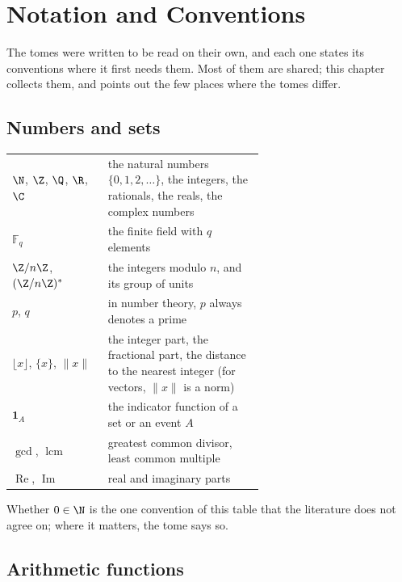\chapter{Notation and Conventions}\label{ch:notation}

The tomes were written to be read on their own, and each one states its conventions where it first needs them. Most of
them are shared; this chapter collects them, and points out the few places where the tomes differ.

\section{Numbers and sets}

\begin{center}\small
\begin{tabular}{@{}lp{0.62\linewidth}@{}}
$\N$, $\Z$, $\Q$, $\R$, $\C$ & the natural numbers $\{0,1,2,\dots\}$, the integers, the rationals, the reals, the complex numbers\\
$\mathbb F_q$ & the finite field with $q$ elements\\
$\Z/n\Z$, $(\Z/n\Z)^*$ & the integers modulo $n$, and its group of units\\
$p$, $q$ & in number theory, $p$ always denotes a prime\\
$\lfloor x\rfloor$, $\{x\}$, $\|x\|$ & the integer part, the fractional part, the distance to the nearest integer (for vectors, $\|x\|$ is a norm)\\
$\mathbf 1_A$ & the indicator function of a set or an event $A$\\
$\gcd$, $\operatorname{lcm}$ & greatest common divisor, least common multiple\\
$\operatorname{Re}$, $\operatorname{Im}$ & real and imaginary parts
\end{tabular}
\end{center}

Whether $0\in\N$ is the one convention of this table that the literature does not agree on; where it matters, the
tome says so.

\section{Arithmetic functions}

